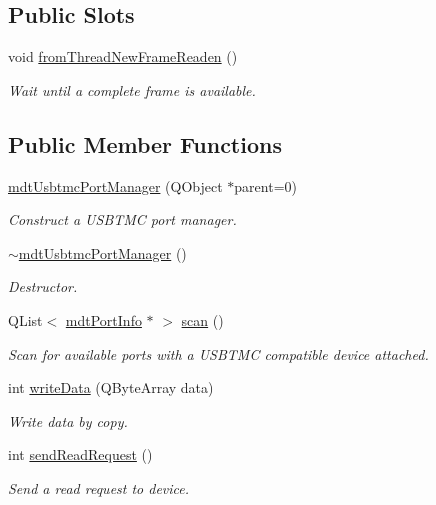 \subsection*{Public Slots}
\begin{DoxyCompactItemize}
\item 
void \hyperlink{classmdt_usbtmc_port_manager_aca42b343ae1f6a324e6e45968f03bbea}{fromThreadNewFrameReaden} ()
\begin{DoxyCompactList}\small\item\em Wait until a complete frame is available. \end{DoxyCompactList}\end{DoxyCompactItemize}
\subsection*{Public Member Functions}
\begin{DoxyCompactItemize}
\item 
\hyperlink{classmdt_usbtmc_port_manager_a99a24e4360e70ffc63677dbe888513f7}{mdtUsbtmcPortManager} (QObject $\ast$parent=0)
\begin{DoxyCompactList}\small\item\em Construct a USBTMC port manager. \end{DoxyCompactList}\item 
\hyperlink{classmdt_usbtmc_port_manager_aad6b2eef9b5cfb5c324affb6962a463b}{$\sim$mdtUsbtmcPortManager} ()
\begin{DoxyCompactList}\small\item\em Destructor. \end{DoxyCompactList}\item 
QList$<$ \hyperlink{classmdt_port_info}{mdtPortInfo} $\ast$ $>$ \hyperlink{classmdt_usbtmc_port_manager_a992d1227810186d3c7dc166452e2e3b6}{scan} ()
\begin{DoxyCompactList}\small\item\em Scan for available ports with a USBTMC compatible device attached. \end{DoxyCompactList}\item 
int \hyperlink{classmdt_usbtmc_port_manager_ab7229e9d519e80a6509bec90dc9239b3}{writeData} (QByteArray data)
\begin{DoxyCompactList}\small\item\em Write data by copy. \end{DoxyCompactList}\item 
int \hyperlink{classmdt_usbtmc_port_manager_a992d24020748e17d577b31e64a73b3e2}{sendReadRequest} ()
\begin{DoxyCompactList}\small\item\em Send a read request to device. \end{DoxyCompactList}\end{DoxyCompactItemize}


